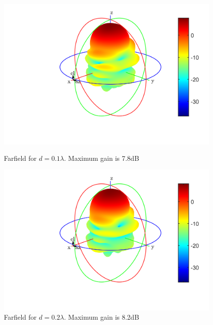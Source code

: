 \begin{figure}[H]
  \centering
  \begin{minipage}[b]{0.5\textwidth}
	\includegraphics[scale = 0.5]{figures/measurement/antennas/array_2_0p1.png}
	\caption{Farfield for $d = 0.1\lambda$. Maximum gain is 7.8dB}
    \label{fig:chamber_two_ant_ff_01}
  \end{minipage}
  \hfill
  \begin{minipage}[b]{0.4\textwidth}
\includegraphics[scale = 0.5]{figures/measurement/antennas/array_2_0p2.png}
\caption{Farfield for $d = 0.2\lambda$. Maximum gain is 8.2dB}
    \label{fig:chamber_two_ant_ff:02}
  \end{minipage}
\end{figure}

